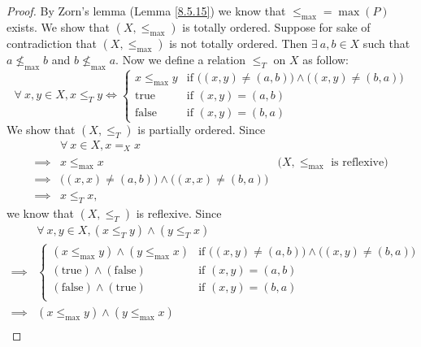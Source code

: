 \begin{proof}
    By Zorn's lemma (Lemma \ref{8.5.15}) we know that \(\leq_{\max} = \max(P)\) exists.
    We show that \((X, \leq_{\max})\) is totally ordered.
    Suppose for sake of contradiction that \((X, \leq_{\max})\) is not totally ordered.
    Then \(\exists\ a, b \in X\) such that \(a \not\leq_{\max} b\) and \(b \not\leq_{\max} a\).
    Now we define a relation \(\leq_T\) on \(X\) as follow:
    \[
        \forall\ x, y \in X, x \leq_T y \iff \begin{cases}
            x \leq_{\max} y & \text{if } \big((x, y) \neq (a, b)\big) \land \big((x, y) \neq (b, a)\big) \\
            \text{true}     & \text{if } (x, y) = (a, b)                                                 \\
            \text{false}    & \text{if } (x, y) = (b, a)
        \end{cases}
    \]
    We show that \((X, \leq_T)\) is partially ordered.
    Since
    \begin{align*}
                 & \forall\ x \in X, x =_X x                                                                                  \\
        \implies & x \leq_{\max} x                                                 & \text{(\(X, \leq_{\max}\) is reflexive)} \\
        \implies & \big((x, x) \neq (a, b)\big) \land \big((x, x) \neq (b, a)\big)                                            \\
        \implies & x \leq_T x,
    \end{align*}
    we know that \((X, \leq_T)\) is reflexive.
    Since
    \begin{align*}
                 & \forall\ x, y \in X, (x \leq_T y) \land (y \leq_T x) \\
        \implies & \begin{cases}
            (x \leq_{\max} y) \land (y \leq_{\max} x) & \text{if } \big((x, y) \neq (a, b)\big) \land \big((x, y) \neq (b, a)\big) \\
            (\text{true}) \land (\text{false})        & \text{if } (x, y) = (a, b)                                                 \\
            (\text{false}) \land (\text{true})        & \text{if } (x, y) = (b, a)                                                 \\
        \end{cases}                           \\
        \implies & (x \leq_{\max} y) \land (y \leq_{\max} x)            \\

\end{align*}
\end{proof}
